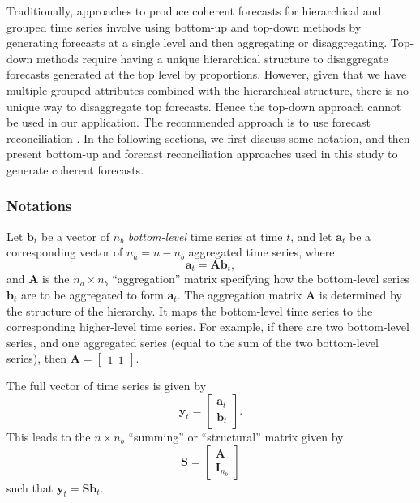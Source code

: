 \documentclass[
  authoryear,
  preprint,
  3p]{elsarticle}
\begin{document}
Traditionally, approaches to produce coherent forecasts for hierarchical
and grouped time series involve using bottom-up and top-down methods by
generating forecasts at a single level and then aggregating or
disaggregating. Top-down methods require having a unique hierarchical
structure to disaggregate forecasts generated at the top level by
proportions. However, given that we have multiple grouped attributes
combined with the hierarchical structure, there is no unique way to
disaggregate top forecasts. Hence the top-down approach cannot be used
in our application. The recommended approach is to use forecast
reconciliation \citep{hyndman2011optimal}. In the following sections, we
first discuss some notation, and then present bottom-up and forecast
reconciliation approaches used in this study to generate coherent
forecasts.

\hypertarget{notations}{%
\subsubsection{Notations}\label{notations}}

Let \(\bm{b}_t\) be a vector of \(n_b\) \emph{bottom-level} time series
at time \(t\), and let \(\bm{a}_t\) be a corresponding vector of
\(n_a = n-n_b\) aggregated time series, where \[
  \bm{a}_t = \bm{A}\bm{b}_t,
\] and \(\bm{A}\) is the \(n_a\times n_b\) ``aggregation'' matrix
specifying how the bottom-level series \(\bm{b}_t\) are to be aggregated
to form \(\bm{a}_t\). The aggregation matrix \(\bm{A}\) is determined by
the structure of the hierarchy. It maps the bottom-level time series to
the corresponding higher-level time series. For example, if there are
two bottom-level series, and one aggregated series (equal to the sum of
the two bottom-level series), then
\(\bm{A} = \begin{bmatrix} 1 ~~ 1 \end{bmatrix}\).

The full vector of time series is given by \[
 \bm{y}_t = \begin{bmatrix}\bm{a}_t \\\bm{b}_t\end{bmatrix}.
\] This leads to the \(n\times n_b\) ``summing'' or ``structural''
matrix given by \[
  \bm{S} = \begin{bmatrix}\bm{A} \\ \bm{I}_{n_b}\end{bmatrix}
\] such that \(\bm{y}_t = \bm{S}\bm{b}_t\).
\end{document}
